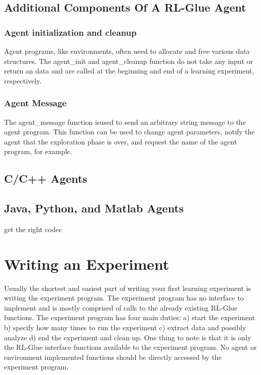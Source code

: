 \documentclass[11pt]{article}
\begin{document}
\subsection{Additional Components Of A RL-Glue Agent}
\label{agentp2}

\subsubsection{Agent initialization and cleanup}
Agent programs, like environments, often need to allocate and free various data structures. The agent\_init and agent\_cleanup function do not take any input or return an data and are called at the beginning and end of a learning experiment, respectively.  

\subsubsection{Agent Message}
The agent\_message function isused to send an arbitrary string message to the agent program. This function can be used to change agent parameters, notify the agent that the exploration phase is over, and request the name of the agent program, for example.

\subsection{C/C++ Agents}
\label{agentp3}

\subsection{Java, Python, and Matlab Agents}
get the right codec

\section{Writing an Experiment}
\label{exp}
Usually the shortest and easiest part of writing your first learning experiment is writing the experiment program. The experiment program has no interface to implement and is mostly comprised of calls to the already existing RL-Glue functions. The experiment program has four main duties: a) start the experiment b) specify how many times to run the experiment c) extract data and possibly analyze d) end the experiment and clean up.  One thing to note is that it is only the RL-Glue interface functions available to the experiment program. No agent or environment implemented functions should be directly accessed by the experiment program.
\end{document}
